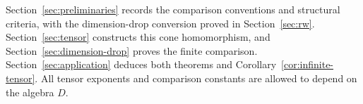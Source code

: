 Section~\ref{sec:preliminaries} records the comparison conventions and
structural criteria, with the dimension-drop conversion proved in
Section~\ref{sec:rw}. Section~\ref{sec:tensor} constructs this cone homomorphism,
and Section~\ref{sec:dimension-drop} proves the finite comparison.
Section~\ref{sec:application} deduces both theorems and
Corollary~\ref{cor:infinite-tensor}. All tensor exponents and comparison
constants are allowed to depend on the algebra $D$.
